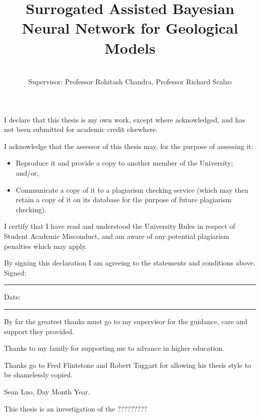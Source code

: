 \documentclass[honours,12pt]{unswthesis}
\title{Surrogated Assisted Bayesian Neural Network for Geological Models}
\author{\Authornameonly\\{\bigskip}Supervisor: Professor Rohitash Chandra, Professor Richard Scalzo}
\newcommand\blankpage{%
    \null
    \thispagestyle{empty}%
    \addtocounter{page}{-1}%
    \newpage}
\numberwithin{equation}{section}
\begin{document}
\beforepreface

\afterpage{\blankpage}



\vskip 10pc \noindent I declare that this thesis is my
own work, except where acknowledged, and has not been submitted for
academic credit elsewhere. 

\vskip 2pc  \noindent I acknowledge that the assessor of this
thesis may, for the purpose of assessing it:
\begin{itemize}
\item Reproduce it and provide a copy to another member of the University; and/or,
\item Communicate a copy of it to a plagiarism checking service (which may then retain a copy of it on its database for the purpose of future plagiarism checking).
\end{itemize}

\vskip 2pc \noindent I certify that I have read and understood the University Rules in
respect of Student Academic Misconduct, and am aware of any potential plagiarism penalties which may 
apply.\vspace{24pt}

\vskip 2pc \noindent By signing 
this declaration I am
agreeing to the statements and conditions above.
\vskip 2pc \noindent
Signed: \rule{7cm}{0.25pt} \hfill Date: \rule{4cm}{0.25pt} \newline
\vskip 1pc

\afterpage{\blankpage}




{\bigskip}By far the greatest thanks must go to my supervisor for
the guidance, care and support they provided. 
 
{\bigskip} Thanks to my family for supporting me to advance in higher education.

{\bigskip\noindent} Thanks go to Fred Flintstone and Robert Taggart for allowing his thesis
style to be shamelessly copied.

{\bigskip\bigskip\bigskip\noindent} Sean Luo, Day Month Year.

\afterpage{\blankpage}



This thesis is an investigation of the ?????????
\end{document}
